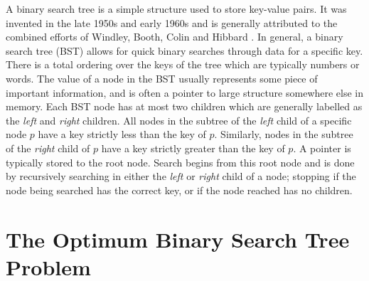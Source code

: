 \documentclass[letterpaper,12pt,titlepage,oneside,final]{book}
\theoremstyle{plain}
\begin{document}
A binary search tree is a simple structure used to store key-value pairs. It was invented in the late 1950s and early 1960s and is generally attributed to the combined efforts of Windley, Booth, Colin and Hibbard \cite{windley1960trees, booth1960efficiency, hibbard1962some}. In general, a binary search tree (BST) allows for quick binary searches through data for a specific key. There is a total ordering over the keys of the tree which are typically numbers or words. The value of a node in the BST usually represents some piece of important information, and is often a pointer to large structure somewhere else in memory. Each BST node has at most two children which are generally labelled as the \textit{left} and \textit{right} children. All nodes in the subtree of the \textit{left} child of a specific node $p$ have a key strictly less than the key of $p$. Similarly, nodes in the subtree of the \textit{right} child of $p$ have a key strictly greater than the key of $p$. A pointer is typically stored to the root node. Search begins from this root node and is done by recursively searching in either the \textit{left} or \textit{right} child of a node; stopping if the node being searched has the correct key, or if the node reached has no children.

\section{The Optimum Binary Search Tree Problem}
\end{document}
